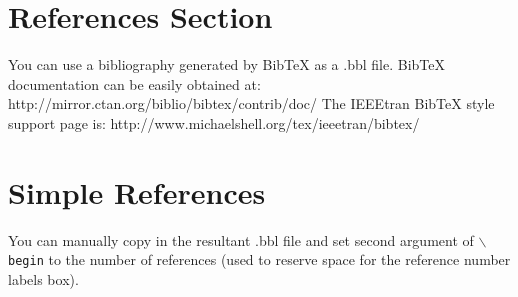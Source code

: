 \documentclass[lettersize,journal]{IEEEtran}
\begin{document}



\section{References Section}
You can use a bibliography generated by BibTeX as a .bbl file.
 BibTeX documentation can be easily obtained at:
 http://mirror.ctan.org/biblio/bibtex/contrib/doc/
 The IEEEtran BibTeX style support page is:
 http://www.michaelshell.org/tex/ieeetran/bibtex/
 
%
%
\section{Simple References}
You can manually copy in the resultant .bbl file and set second argument of $\backslash${\tt{begin}} to the number of references
 (used to reserve space for the reference number labels box).
\end{document}
